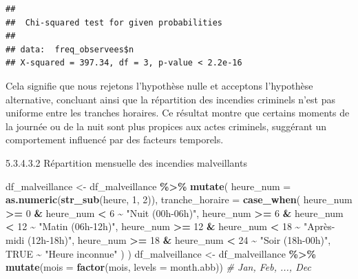 \documentclass[
]{article}
\newenvironment{Shaded}{\begin{snugshade}}{\end{snugshade}}
\newcommand{\AttributeTok}[1]{\textcolor[rgb]{0.13,0.29,0.53}{#1}}
\newcommand{\CommentTok}[1]{\textcolor[rgb]{0.56,0.35,0.01}{\textit{#1}}}
\newcommand{\ConstantTok}[1]{\textcolor[rgb]{0.56,0.35,0.01}{#1}}
\newcommand{\DecValTok}[1]{\textcolor[rgb]{0.00,0.00,0.81}{#1}}
\newcommand{\FunctionTok}[1]{\textcolor[rgb]{0.13,0.29,0.53}{\textbf{#1}}}
\newcommand{\NormalTok}[1]{#1}
\newcommand{\OtherTok}[1]{\textcolor[rgb]{0.56,0.35,0.01}{#1}}
\newcommand{\SpecialCharTok}[1]{\textcolor[rgb]{0.81,0.36,0.00}{\textbf{#1}}}
\newcommand{\StringTok}[1]{\textcolor[rgb]{0.31,0.60,0.02}{#1}}
\begin{document}
\begin{verbatim}
## 
##  Chi-squared test for given probabilities
## 
## data:  freq_observees$n
## X-squared = 397.34, df = 3, p-value < 2.2e-16
\end{verbatim}

Cela signifie que nous rejetons l'hypothèse nulle et acceptons
l'hypothèse alternative, concluant ainsi que la répartition des
incendies criminels n'est pas uniforme entre les tranches horaires. Ce
résultat montre que certains moments de la journée ou de la nuit sont
plus propices aux actes criminels, suggérant un comportement influencé
par des facteurs temporels.

5.3.4.3.2 Répartition mensuelle des incendies malveillants

\begin{Shaded}
\begin{Highlighting}[]
\NormalTok{df\_malveillance }\OtherTok{\textless{}{-}}\NormalTok{ df\_malveillance }\SpecialCharTok{\%\textgreater{}\%}
  \FunctionTok{mutate}\NormalTok{(}
    \AttributeTok{heure\_num =} \FunctionTok{as.numeric}\NormalTok{(}\FunctionTok{str\_sub}\NormalTok{(heure, }\DecValTok{1}\NormalTok{, }\DecValTok{2}\NormalTok{)),}
    \AttributeTok{tranche\_horaire =} \FunctionTok{case\_when}\NormalTok{(}
\NormalTok{      heure\_num }\SpecialCharTok{\textgreater{}=} \DecValTok{0} \SpecialCharTok{\&}\NormalTok{ heure\_num }\SpecialCharTok{\textless{}} \DecValTok{6} \SpecialCharTok{\textasciitilde{}} \StringTok{"Nuit (00h{-}06h)"}\NormalTok{,}
\NormalTok{      heure\_num }\SpecialCharTok{\textgreater{}=} \DecValTok{6} \SpecialCharTok{\&}\NormalTok{ heure\_num }\SpecialCharTok{\textless{}} \DecValTok{12} \SpecialCharTok{\textasciitilde{}} \StringTok{"Matin (06h{-}12h)"}\NormalTok{,}
\NormalTok{      heure\_num }\SpecialCharTok{\textgreater{}=} \DecValTok{12} \SpecialCharTok{\&}\NormalTok{ heure\_num }\SpecialCharTok{\textless{}} \DecValTok{18} \SpecialCharTok{\textasciitilde{}} \StringTok{"Après{-}midi (12h{-}18h)"}\NormalTok{,}
\NormalTok{      heure\_num }\SpecialCharTok{\textgreater{}=} \DecValTok{18} \SpecialCharTok{\&}\NormalTok{ heure\_num }\SpecialCharTok{\textless{}} \DecValTok{24} \SpecialCharTok{\textasciitilde{}} \StringTok{"Soir (18h{-}00h)"}\NormalTok{,}
      \ConstantTok{TRUE} \SpecialCharTok{\textasciitilde{}} \StringTok{"Heure inconnue"}
\NormalTok{    )}
\NormalTok{  )}
\NormalTok{df\_malveillance }\OtherTok{\textless{}{-}}\NormalTok{ df\_malveillance }\SpecialCharTok{\%\textgreater{}\%}
  \FunctionTok{mutate}\NormalTok{(}\AttributeTok{mois =} \FunctionTok{factor}\NormalTok{(mois, }\AttributeTok{levels =}\NormalTok{ month.abb))  }\CommentTok{\# Jan, Feb, ..., Dec}


\end{Highlighting}
\end{Shaded}
\end{document}
